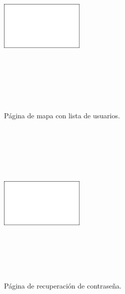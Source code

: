 \documentclass[a4paper, 12pt]{article}
\begin{document}
\begin{figure}[H]
   	\begin{minipage}{0.48\textwidth}
		\begin{center}
			{\includegraphics[height=8cm, width=4cm]{White.png}\par}
			\caption{Página de mapa con lista de usuarios.}
			\medskip
		\end{center}  
	\end{minipage}\hfill
   	\begin{minipage}{0.48\textwidth}
		\begin{center}
			{\includegraphics[height=8cm, width=4cm]{White.png}\par}
			\caption{Página de recuperación de contraseña.}
			\medskip
		\end{center}  
	\end{minipage}\hfill
\end{figure}
\end{document}
